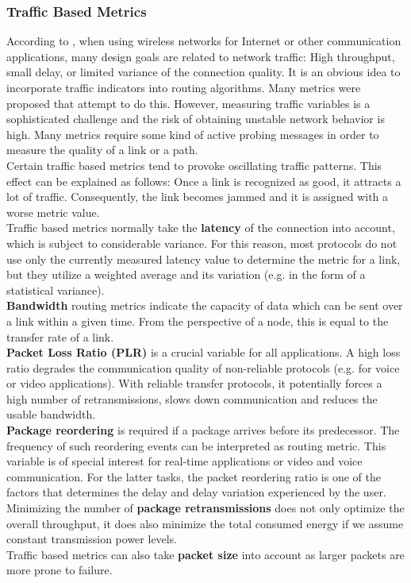\subsubsection{Traffic Based Metrics}
According to \cite{SurveyOnRoutingMetrics}, when using wireless networks for Internet or other communication applications, many design goals are related to network traffic: High throughput, small delay, or limited variance of the connection quality. It is an obvious idea to incorporate traffic indicators into routing algorithms. Many metrics were proposed that attempt to do this. However, measuring traffic variables is a sophisticated challenge and the risk of obtaining unstable network behavior is high. Many metrics require some kind of active probing messages in order to measure the quality of a link or a path.\\
Certain traffic based metrics tend to provoke oscillating traffic patterns. This effect can be explained as follows: Once a link is recognized as good, it attracts a lot of traffic. Consequently, the link becomes jammed and it is assigned with a worse metric value.\\
Traffic based metrics normally take the \textbf{latency} of the connection into account, which is subject to considerable variance. For this reason, most protocols do not use only the currently measured latency value to determine the metric for a link, but they utilize a weighted average and its variation (e.g. in the form of a statistical variance).\\
\textbf{Bandwidth} routing metrics indicate the capacity of data which can be sent over a link within a given time. From the perspective of a node, this is equal to the transfer rate of a link.\\
\textbf{Packet Loss Ratio (PLR)} is a crucial variable for all applications. A high loss ratio degrades the communication quality of non-reliable protocols (e.g. for voice or video applications). With reliable transfer protocols, it potentially forces a high number of retransmissions, slows down communication and reduces the usable bandwidth.\\
\textbf{Package reordering} is required if a package arrives before its predecessor. The frequency of such reordering events can be interpreted as routing metric. This variable is of special interest for real-time applications or video and voice communication. For the latter tasks, the packet reordering ratio is one of the factors that determines the delay and delay variation experienced by the user.\\
Minimizing the number of \textbf{package retransmissions} does not only optimize the overall throughput, it does also minimize the total consumed energy if we assume constant transmission power levels.\\
Traffic based metrics can also take \textbf{packet size} into account as larger packets are more prone to failure.
% 
